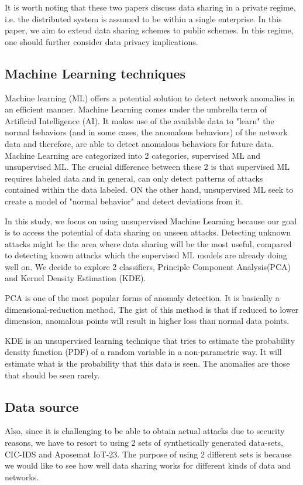 \begin{background}
It is worth noting that these two papers discuss data sharing in a private regime, i.e. the distributed system is assumed to be within a single enterprise. In this paper, we aim to extend data sharing schemes to public schemes. In this regime, one should further consider data privacy implications.


\subsection{Machine Learning techniques}
Machine learning (ML) offers a potential solution to detect network anomalies in an efficient manner. Machine Learning comes under the umbrella term of Artificial Intelligence (AI). It makes use of the available data to "learn" the normal behaviors (and in some cases, the anomalous behaviors) of the network data and therefore, are able to detect anomalous behaviors for future data. 
Machine Learning are categorized into 2 categories, supervised ML and unsupervised ML. The crucial difference between these 2 is that supervised ML requires labeled data and in general, can only detect patterns of attacks contained within the data labeled. ON the other hand, unsupervised ML seek to create a model of "normal behavior" and detect deviations from it.

In this study, we focus on using unsupervised Machine Learning because our goal is to access the potential of data sharing on unseen attacks. Detecting unknown attacks might be the area where data sharing will be the most useful, compared to detecting known attacks which the supervised ML models are already doing well on. We decide to explore 2 classifiers, Principle Component Analysis(PCA) and Kernel Density Estimation (KDE). 

PCA is one of the most popular forms of anomaly detection. It is basically a dimensional-reduction method, The gist of this method is that if reduced to lower dimension, anomalous points will result in higher loss than normal data points.

KDE is an unsupervised learning technique that tries to estimate the probability density function (PDF) of a random variable in a non-parametric way. It will estimate what is the probability that this data is seen. The anomalies are those that should be seen rarely.







\subsection{Data source}
Also, since it is challenging to be able to obtain actual attacks due to security reasons, we have to resort to using 2 sets of synthetically generated data-sets, CIC-IDS and Aposemat IoT-23. The purpose of using 2 different sets is because we would like to see how well data sharing works for different kinds of data and networks.  


\end{background}
